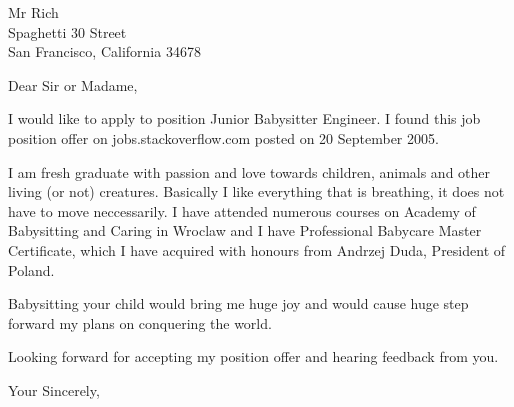 \documentclass[10pt,a4paper]{letter}
\begin{document}
 
\begin{letter}{Mr Rich\\Spaghetti 30 Street\\San Francisco, California 34678} 
\opening{Dear Sir or Madame,} 
 
I would like to apply to position Junior Babysitter Engineer. I found this job position offer on jobs.stackoverflow.com posted on 20 September 2005.

I am fresh graduate with passion and love towards children, animals and other living (or not) creatures. Basically I like everything that is breathing, it does not have to move neccessarily. I have attended numerous courses on Academy of Babysitting and Caring in Wroclaw and I have Professional Babycare Master Certificate, which I have acquired with honours from Andrzej Duda, President of Poland.

Babysitting your child would bring me huge joy and would cause huge step forward my plans on conquering the world.

Looking forward for accepting my position offer and hearing feedback from you.
\closing{Your Sincerely,} 
\end{letter} 
\end{document}
